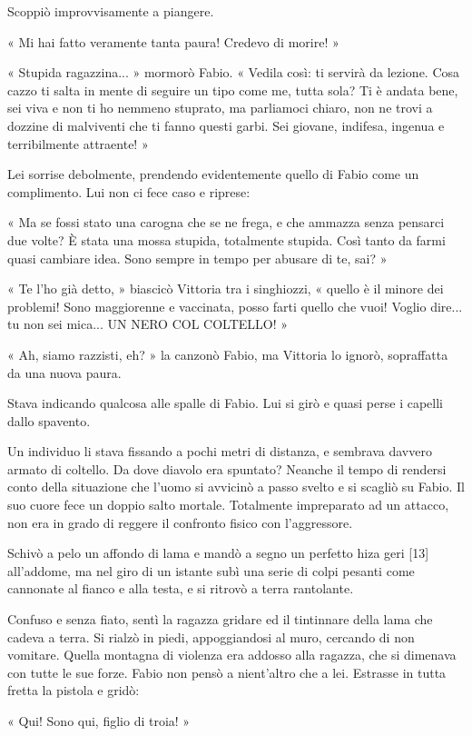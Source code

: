 Scoppiò improvvisamente a piangere.

« Mi hai fatto veramente tanta paura! Credevo di morire! »

« Stupida ragazzina... » mormorò Fabio. « Vedila così: ti servirà da lezione. Cosa cazzo ti salta in mente di seguire un tipo come me, tutta sola? Ti è andata bene, sei viva e non ti ho nemmeno stuprato, ma parliamoci chiaro, non ne trovi a dozzine di malviventi che ti fanno questi garbi. Sei giovane, indifesa, ingenua e terribilmente attraente! »

Lei sorrise debolmente, prendendo evidentemente quello di Fabio come un complimento. Lui non ci fece caso e riprese:

« Ma se fossi stato una carogna che se ne frega, e che ammazza senza pensarci due volte? È stata una mossa stupida, totalmente stupida. Così tanto da farmi quasi cambiare idea. Sono sempre in tempo per abusare di te, sai? »

« Te l'ho già detto, » biascicò Vittoria tra i singhiozzi, « quello è il minore dei problemi! Sono maggiorenne e vaccinata, posso farti quello che vuoi! Voglio dire... tu non sei mica... UN NERO COL COLTELLO! »

« Ah, siamo razzisti, eh? » la canzonò Fabio, ma Vittoria lo ignorò, sopraffatta da una nuova paura.

Stava indicando qualcosa alle spalle di Fabio. Lui si girò e quasi perse i capelli dallo spavento.

Un individuo li stava fissando a pochi metri di distanza, e sembrava davvero armato di coltello. Da dove diavolo era spuntato? Neanche il tempo di rendersi conto della situazione che l'uomo si avvicinò a passo svelto e si scagliò su Fabio. Il suo cuore fece un doppio salto mortale. Totalmente impreparato ad un attacco, non era in grado di reggere il confronto fisico con l'aggressore.

Schivò a pelo un affondo di lama e mandò a segno un perfetto hiza geri [13] all'addome, ma nel giro di un istante subì una serie di colpi pesanti come cannonate al fianco e alla testa, e si ritrovò a terra rantolante.

Confuso e senza fiato, sentì la ragazza gridare ed il tintinnare della lama che cadeva a terra. Si rialzò in piedi, appoggiandosi al muro, cercando di non vomitare. Quella montagna di violenza era addosso alla ragazza, che si dimenava con tutte le sue forze. Fabio non pensò a nient'altro che a lei. Estrasse in tutta fretta la pistola e gridò:

« Qui! Sono qui, figlio di troia! »

